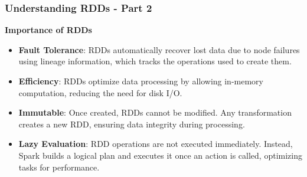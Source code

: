 \documentclass{beamer}
\begin{document}
\begin{frame}[fragile]
    \frametitle{Understanding RDDs - Part 2}

    \textbf{Importance of RDDs}
    \begin{itemize}
        \item \textbf{Fault Tolerance}: 
        RDDs automatically recover lost data due to node failures using lineage information, which tracks the operations used to create them.
        
        \item \textbf{Efficiency}: 
        RDDs optimize data processing by allowing in-memory computation, reducing the need for disk I/O.
        
        \item \textbf{Immutable}:
        Once created, RDDs cannot be modified. Any transformation creates a new RDD, ensuring data integrity during processing.
        
        \item \textbf{Lazy Evaluation}:
        RDD operations are not executed immediately. Instead, Spark builds a logical plan and executes it once an action is called, optimizing tasks for performance.
    \end{itemize}
\end{frame}
\end{document}
